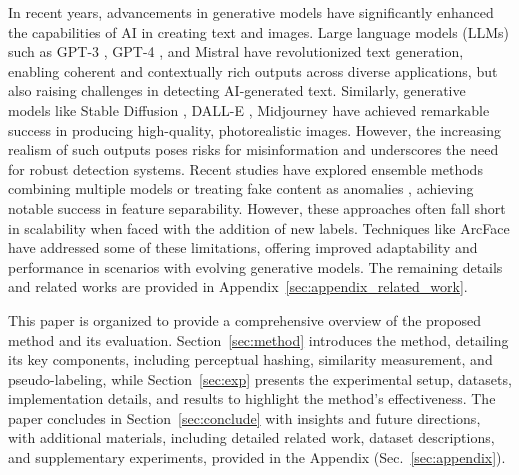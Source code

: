 In recent years, advancements in generative models have significantly enhanced the capabilities of AI in creating text and images. Large language models (LLMs) such as GPT-3 \cite{brown2020language}, GPT-4 \cite{achiam2023gpt}, and Mistral \cite{jiang2023mistral} have revolutionized text generation, enabling coherent and contextually rich outputs across diverse applications, but also raising challenges in detecting AI-generated text. Similarly, generative models like Stable Diffusion \cite{rombach2022high}, DALL-E \cite{ramesh2021zero}, Midjourney \cite{midjourney} have achieved remarkable success in producing high-quality, photorealistic images. However, the increasing realism of such outputs poses risks for misinformation and underscores the need for robust detection systems. Recent studies have explored ensemble methods combining multiple models \cite{mohamed2024proposed, abburi2023generative} or treating fake content as anomalies \cite{khalidOCFakeDectClassifyingDeepfakes2020}, achieving notable success in feature separability. However, these approaches often fall short in scalability when faced with the addition of new labels. Techniques like ArcFace have addressed some of these limitations, offering improved adaptability and performance in scenarios with evolving generative models. The remaining details and related works are provided in Appendix~\ref{sec:appendix_related_work}.


This paper is organized to provide a comprehensive overview of the proposed method and its evaluation. Section~\ref{sec:method} introduces the method, detailing its key components, including perceptual hashing, similarity measurement, and pseudo-labeling, while Section~\ref{sec:exp} presents the experimental setup, datasets, implementation details, and results to highlight the method's effectiveness. The paper concludes in Section~\ref{sec:conclude} with insights and future directions, with additional materials, including detailed related work, dataset descriptions, and supplementary experiments, provided in the Appendix (Sec.~\ref{sec:appendix}).
